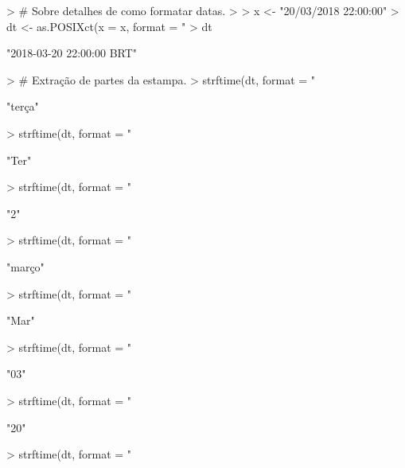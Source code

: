 \documentclass[a4paper]{article}
\begin{document}
\begin{Schunk}
\begin{Sinput}
> # Sobre detalhes de como formatar datas.
> 
> x <- "20/03/2018 22:00:00"
> dt <- as.POSIXct(x = x, format = "%d/%m/%Y %H:%M:%S")
> dt
\end{Sinput}
\begin{Soutput}
[1] "2018-03-20 22:00:00 BRT"
\end{Soutput}
\begin{Sinput}
> # Extração de partes da estampa.
> strftime(dt, format = "%A") # Dia da semana.
\end{Sinput}
\begin{Soutput}
[1] "terça"
\end{Soutput}
\begin{Sinput}
> strftime(dt, format = "%a") # Dia da semana abreviado.
\end{Sinput}
\begin{Soutput}
[1] "Ter"
\end{Soutput}
\begin{Sinput}
> strftime(dt, format = "%w") # Número do dia da semana (Seg = 1).
\end{Sinput}
\begin{Soutput}
[1] "2"
\end{Soutput}
\begin{Sinput}
> strftime(dt, format = "%B") # Nome do mês.
\end{Sinput}
\begin{Soutput}
[1] "março"
\end{Soutput}
\begin{Sinput}
> strftime(dt, format = "%b") # Nome do mês abreviado.
\end{Sinput}
\begin{Soutput}
[1] "Mar"
\end{Soutput}
\begin{Sinput}
> strftime(dt, format = "%m") # Número do mês.
\end{Sinput}
\begin{Soutput}
[1] "03"
\end{Soutput}
\begin{Sinput}
> strftime(dt, format = "%d") # Dia do mês.
\end{Sinput}
\begin{Soutput}
[1] "20"
\end{Soutput}
\begin{Sinput}
> strftime(dt, format = "%j") # Dia do ano, de 1 até 365/366.
\end{Sinput}

\end{Schunk}
\end{document}
